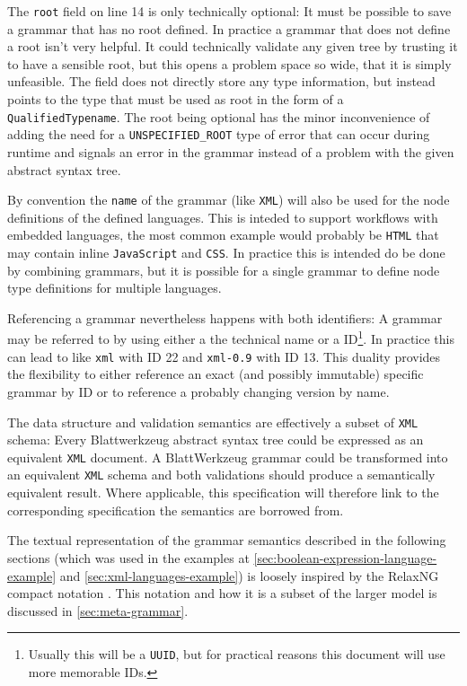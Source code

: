 \documentclass[]{report}
\begin{document}
The \texttt{root} field on line 14 is only technically optional: It must be possible to save a grammar that has no root defined. In practice a grammar that does not define a root isn't very helpful. It could technically validate any given tree by trusting it to have a sensible root, but this opens a problem space so wide, that it is simply unfeasible. The field does not directly store any type information, but instead points to the type that must be used as root in the form of a \texttt{QualifiedTypename}. The root being optional has the minor inconvenience of adding the need for a \texttt{UNSPECIFIED\_ROOT} type of error that can occur during runtime and signals an error in the grammar instead of a problem with the given abstract syntax tree.

By convention the \texttt{name} of the grammar (like \texttt{XML}) will also be used for the node definitions of the defined languages. This is inteded to support workflows with embedded languages, the most common example would probably be \texttt{HTML} that may contain inline \texttt{JavaScript} and \texttt{CSS}. In practice this is intended do be done by combining grammars, but it is possible for a single grammar to define node type definitions for multiple languages.

Referencing a grammar nevertheless happens with both identifiers: A grammar may be referred to by using either a the technical name or a ID\footnote{Usually this will be a \texttt{UUID}, but for practical reasons this document will use more memorable IDs.}. In practice this can lead to like \texttt{xml} with ID 22 and \texttt{xml-0.9} with ID 13. This duality provides the flexibility to either reference an exact (and possibly immutable) specific grammar by ID or to reference a probably changing version by name.


The data structure and validation semantics are effectively a subset of \texttt{XML} schema\cite{W3CXMLSchema}: Every Blattwerkzeug abstract syntax tree could be expressed as an equivalent \texttt{XML} document. A Blatt\-Werkzeug grammar could be transformed into an equivalent \texttt{XML} schema and both validations should produce a semantically equivalent result. Where applicable, this specification will therefore link to the corresponding specification the semantics are borrowed from.

The textual representation of the grammar semantics described in the following sections (which was used in the examples at \cref{sec:boolean-expression-language-example} and \cref{sec:xml-languages-example}) is loosely inspired by the RelaxNG compact notation \cite{clarkRELAXNGSpecification2001}. This notation and how it is a subset of the larger model is discussed in \cref{sec:meta-grammar}.
\end{document}
